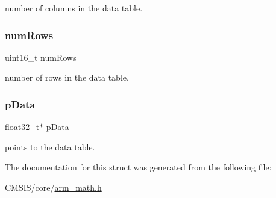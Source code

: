 number of columns in the data table. \mbox{\label{structarm__bilinear__interp__instance__f32_a1bcf80ccdc2acc29198f1592ae300390}} 
\subsubsection{\texorpdfstring{numRows}{numRows}}
{\footnotesize\ttfamily uint16\+\_\+t num\+Rows}

number of rows in the data table. \mbox{\label{structarm__bilinear__interp__instance__f32_af5c3a2f15c98850cdcfbe6f87e5ac5df}} 
\subsubsection{\texorpdfstring{pData}{pData}}
{\footnotesize\ttfamily \mbox{\hyperlink{arm__math_8h_a4611b605e45ab401f02cab15c5e38715}{float32\+\_\+t}}$\ast$ p\+Data}

points to the data table. 

The documentation for this struct was generated from the following file\+:\begin{DoxyCompactItemize}
\item 
C\+M\+S\+I\+S/core/\mbox{\hyperlink{arm__math_8h}{arm\+\_\+math.\+h}}\end{DoxyCompactItemize}
